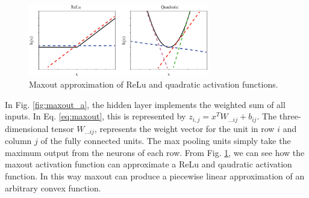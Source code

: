 \begin{figure}[ht]
    \centering
    \includegraphics[width=0.7\textwidth]{img/max_func.eps}
    \caption{Maxout approximation of ReLu and quadratic activation functions.}
    \label{fig:maxout_func}
\end{figure}

In Fig. \ref{fig:maxout_a}, the hidden layer implements the weighted sum of all inputs. In Eq. \ref{eq:maxout}, this is represented by $z_{i,j} = x^{T}W_{...ij} + b_{ij}$. The three-dimensional tensor $W_{...ij}$, represents the weight vector for the unit in row $i$ and column $j$ of the fully connected units. The max pooling units simply take the maximum output from the neurons of each row. From Fig. \ref{fig:maxout_func}, we can see how the maxout activation function can approximate a ReLu and qaudratic activation function. In this way maxout can produce a piecewise linear approximation of an arbitrary convex function.